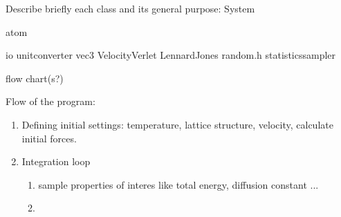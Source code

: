 

Describe briefly each class and its general purpose:
System

atom


io
unitconverter
vec3
VelocityVerlet
LennardJones
random.h
statisticssampler


flow chart(s?)



Flow of the program: 
\begin{enumerate} 
	\item Defining initial settings: temperature, lattice structure, velocity, calculate initial forces. 	
	\item Integration loop
	\begin{enumerate}
		\item sample properties of interes like total energy, diffusion constant ...
		\item 
	\end{enumerate}
	
	
\end{enumerate}